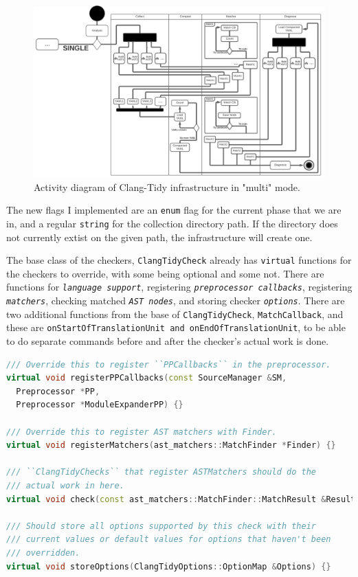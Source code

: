 \begin{figure}[H]
	\includegraphics[width=\linewidth]{images/activity_multi.png}
	\caption{Activity diagram of Clang-Tidy infrastructure in "multi" mode.}
	\label{fig:activity-multi}
\end{figure}

The new flags I implemented are an \lstinline{enum} flag for the current phase that we are in, and a regular \lstinline{string}
for the collection directory path. If the directory does not currently extist on the given path, the infrastructure will create one.

The base class of the checkers, \texttt{ClangTidyCheck} already has \lstinline{virtual} functions for the checkers to override, with some
being optional and some not.
There are functions for \emph{\texttt{language support}}, registering \emph{\texttt{preprocessor callbacks}}, registering
\emph{\texttt{matchers}}, checking matched \emph{\texttt{AST nodes}}, and storing checker \emph{\texttt{options}}.
There are two additional functions from the base of
\texttt{ClangTidyCheck}, \texttt{MatchCallback}, and these are \texttt{onStartOfTranslationUnit and onEndOfTranslationUnit}, to
be able to do separate commands before and after the checker's actual work is done.

\begin{lstlisting}[language={C++},caption={Virtual functions from \texttt{ClangTidyCheck}'s header.},label={lst:ctc-single-virtual}]
/// Override this to register ``PPCallbacks`` in the preprocessor.
virtual void registerPPCallbacks(const SourceManager &SM,
  Preprocessor *PP,
  Preprocessor *ModuleExpanderPP) {}

/// Override this to register AST matchers with Finder.
virtual void registerMatchers(ast_matchers::MatchFinder *Finder) {}

/// ``ClangTidyChecks`` that register ASTMatchers should do the
/// actual work in here.
virtual void check(const ast_matchers::MatchFinder::MatchResult &Result) {}

/// Should store all options supported by this check with their
/// current values or default values for options that haven't been
/// overridden.
virtual void storeOptions(ClangTidyOptions::OptionMap &Options) {}
\end{lstlisting}

